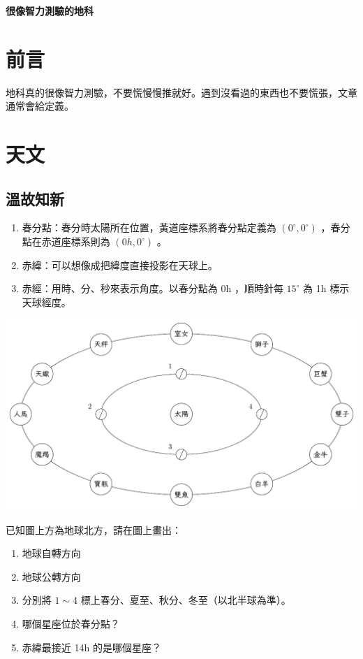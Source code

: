 \documentclass[12pt]{article}
\newcommand{\testtitle}[1]{ \begin{center}{\large\bf #1}\end{center} }
\begin{document}
\testtitle{很像智力測驗的地科}

\section{前言}

地科真的很像智力測驗，不要慌慢慢推就好。遇到沒看過的東西也不要慌張，文章通常會給定義。

\section{天文}

\subsection{溫故知新}

\begin{enumerate}
	\item 春分點：春分時太陽所在位置，黃道座標系將春分點定義為 $(0^\circ, 0^\circ)$ ，春分點在赤道座標系則為 $(0h, 0^\circ)$ 。
	\item 赤緯：可以想像成把緯度直接投影在天球上。
	\item 赤經：用時、分、秒來表示角度。以春分點為 0h ，順時針每 $15^\circ$ 為 1h 標示天球經度。
\end{enumerate}

\begin{center} \includegraphics*{a.pdf} \end{center}

已知圖上方為地球北方，請在圖上畫出：

\begin{enumerate}
	\item 地球自轉方向
	\item 地球公轉方向
	\item 分別將 $1 \sim 4$ 標上春分、夏至、秋分、冬至（以北半球為準）。
	\item 哪個星座位於春分點？
	\item 赤緯最接近 14h 的是哪個星座？
\end{enumerate}
\end{document}
